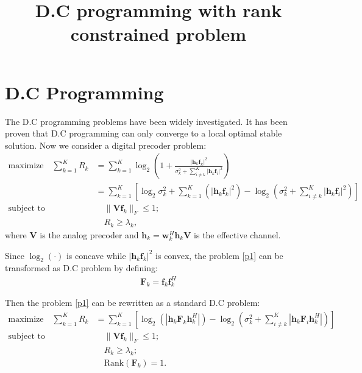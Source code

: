 \documentclass[12pt]{article}
\begin{document}
\title{D.C programming with rank constrained problem}



\maketitle \thispagestyle{plain}


\maketitle


\section{D.C Programming}
The D.C programming problems have been widely investigated. It has been proven that D.C programming can only converge to a  local optimal stable solution. Now we consider a digital precoder problem:
\begin{align}\label{p1}
	\text{maximize} \quad \sum_{k=1}^{K}R_k &= \sum_{k=1}^{K}\log_2\left( 1+\frac{|\bm{h}_k \bm{f}_k|^2}{\sigma_k^2 + \sum_{i\neq k}^{K}|\bm{h}_k \bm{f}_i|^2} \right)\\
	&=\sum_{k=1}^{K}\left[\log_2 \sigma_k^2 + \sum_{k=1}^{K}\left(|\bm{h}_k \bm{f}_k|^2 \right) - \log_2 \left(\sigma_k^2 + \sum_{i\neq k}^{K}|\bm{h}_k \bm{f}_i|^2\right)\right]\nonumber\\
	\text{subject to} & \quad \|\bm{V}\bm{f}_k\|_F \leq 1 ;  \nonumber\\
	& \quad R_k \geq \lambda_k,
\end{align}
where $\bm{V}$ is the analog precoder and $\bm{h}_k = \bm{w}_k^H \bm{h}_k \bm{V}$ is the effective channel.

Since $\log_2 (\cdot)$ is concave while $|\bm{h}_k \bm{f}_k|^2$ is convex, the problem \eqref{p1} can be transformed as D.C problem by defining:
\begin{align}
	\bm{F}_k = \bm{f}_k\bm{f}_k^H
\end{align} 

Then the problem \eqref{p1} can be rewritten as a standard D.C problem: 
\begin{align}\label{p2}
\text{maximize} \quad \sum_{k=1}^{K}R_k & =\sum_{k=1}^{K} \left[\log_2 \left(|\bm{h}_k \bm{F}_k\bm{h}_k^H| \right) - \log_2 \left(\sigma_k^2 + \sum_{i\neq k}^{K}|\bm{h}_k \bm{F}_i \bm{h}^H_k|\right)\right]\\
\text{subject to} & \quad \|\bm{V}\bm{f}_k\|_F \leq 1 ;  \nonumber\\
& \quad R_k \geq \lambda_k; \nonumber\\
& \quad \text{Rank}(\bm{F}_k) = 1.\nonumber
\end{align}
\end{document}
